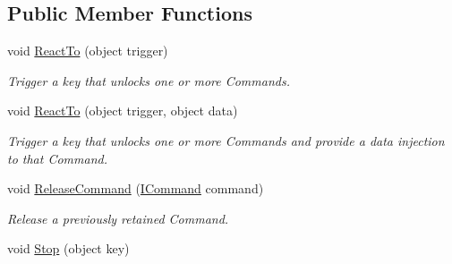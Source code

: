 \subsection*{Public Member Functions}
\begin{DoxyCompactItemize}
\item 
\hypertarget{interfacestrange_1_1extensions_1_1command_1_1api_1_1_i_command_binder_a1703954ba61a4468ef7189cbe6263e85}{void \hyperlink{interfacestrange_1_1extensions_1_1command_1_1api_1_1_i_command_binder_a1703954ba61a4468ef7189cbe6263e85}{React\-To} (object trigger)}\label{interfacestrange_1_1extensions_1_1command_1_1api_1_1_i_command_binder_a1703954ba61a4468ef7189cbe6263e85}

\begin{DoxyCompactList}\small\item\em Trigger a key that unlocks one or more Commands. \end{DoxyCompactList}\item 
\hypertarget{interfacestrange_1_1extensions_1_1command_1_1api_1_1_i_command_binder_aa409f9906be371e9818e30012091b67c}{void \hyperlink{interfacestrange_1_1extensions_1_1command_1_1api_1_1_i_command_binder_aa409f9906be371e9818e30012091b67c}{React\-To} (object trigger, object data)}\label{interfacestrange_1_1extensions_1_1command_1_1api_1_1_i_command_binder_aa409f9906be371e9818e30012091b67c}

\begin{DoxyCompactList}\small\item\em Trigger a key that unlocks one or more Commands and provide a data injection to that Command. \end{DoxyCompactList}\item 
void \hyperlink{interfacestrange_1_1extensions_1_1command_1_1api_1_1_i_command_binder_ae063357e7694fe0e107a53cc77e8e112}{Release\-Command} (\hyperlink{interfacestrange_1_1extensions_1_1command_1_1api_1_1_i_command}{I\-Command} command)
\begin{DoxyCompactList}\small\item\em Release a previously retained Command. \end{DoxyCompactList}\item 
\hypertarget{interfacestrange_1_1extensions_1_1command_1_1api_1_1_i_command_binder_a713eaa890edf38bdb3762579aab91609}{void \hyperlink{interfacestrange_1_1extensions_1_1command_1_1api_1_1_i_command_binder_a713eaa890edf38bdb3762579aab91609}{Stop} (object key)}\label{interfacestrange_1_1extensions_1_1command_1_1api_1_1_i_command_binder_a713eaa890edf38bdb3762579aab91609}


\end{DoxyCompactItemize}

